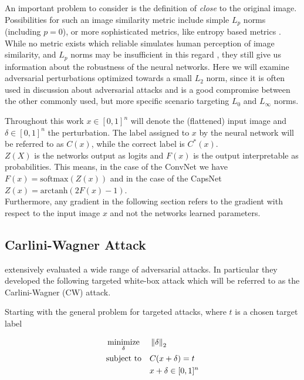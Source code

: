 An important problem to consider is the definition of \emph{close} to the original image. Possibilities for such an image similarity metric include simple $L_p$ norms (including $p=0$),
or more sophisticated metrics, like entropy based metrics \citep{umbrella}.
While no metric exists which reliable simulates human perception of image similarity, and $L_p$ norms may be insufficient in this regard \citep{lpnorms}, they still give us information about the robustness of the neural networks.
Here we will examine adversarial perturbations optimized towards a small $L_2$ norm, since it is often used in discussion about adversarial attacks and is a good compromise between the other commonly used, but more specific scenario targeting $L_0$ and $L_\infty$ norms.

Throughout this work $x \in [0,1]^n$ will denote the (flattened) input image and $\delta \in [0,1]^n$ the perturbation.
The label assigned to $x$ by the neural network will be referred to as $C(x)$, while the correct label is $C^*(x)$.\\
$Z(X)$ is the networks output as logits and $F(x)$ is the output interpretable as probabilities.
This means, in the case of the ConvNet we have $F(x) = \mathrm{softmax}(Z(x))$ and in the case of the CapsNet $Z(x) = \mathrm{arctanh}(2F(x) - 1)$. \\
Furthermore, any gradient in the following section refers to the gradient with respect to the input image $x$ and not the networks learned parameters.

\subsection{Carlini-Wagner Attack}

\citet{carlini} extensively evaluated a wide range of adversarial attacks.
In particular they developed the following targeted white-box attack which will be referred to as the Carlini-Wagner (CW) attack.

Starting with the general problem for targeted attacks, where $t$ is a chosen target label

\begin{equation}
\begin{aligned}
& \operatorname*{minimize}_{\delta} && \left \lVert \delta \right \rVert _{2} \\
& \text{subject to} && C(x + \delta) = t \\
& && x + \delta \in [0,1]^n
\end{aligned}
\end{equation}

